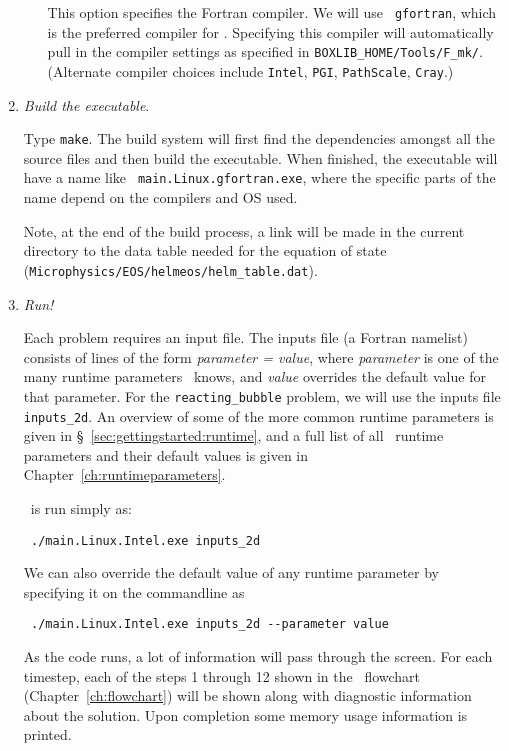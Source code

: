 \begin{enumerate}
\begin{itemize}
This option specifies the Fortran compiler.  We will use {\tt
gfortran}, which is the preferred compiler for \maestro.  Specifying
this compiler will automatically pull in the compiler settings as
specified in {\tt BOXLIB\_HOME/Tools/F\_mk/}.  (Alternate compiler
choices include {\tt Intel}, {\tt PGI}, {\tt PathScale}, {\tt Cray}.)

\end{itemize}


\item {\em Build the executable}.

Type {\tt make}.  The build system will first find the dependencies
amongst all the source files and then build the executable.  When
finished, the executable will have a name like {\tt
main.Linux.gfortran.exe}, where the specific parts of the name depend
on the compilers and OS used.

Note, at the end of the build process, a link will be made in the
current directory to the data table needed for the equation of state
({\tt Microphysics/EOS/helmeos/helm\_table.dat}).


\item {\em Run!}

Each problem requires an input file.  The inputs file (a Fortran
namelist) consists of
lines of the form {\em parameter = value}, where {\em parameter} is
one of the many runtime parameters \maestro\ knows, and {\em value}
overrides the default value for that parameter.  For the {\tt reacting\_bubble}
problem, we will use the inputs file {\tt inputs\_2d}.  An overview of
some of the more common runtime parameters is given
in \S~\ref{sec:gettingstarted:runtime}, and a full list of
all \maestro\ runtime parameters and their default values is given in
Chapter~\ref{ch:runtimeparameters}.

\maestro\ is run simply as:
\begin{verbatim}
 ./main.Linux.Intel.exe inputs_2d
\end{verbatim}
We can also override the default value of any runtime parameter by specifying
it on the commandline as
\begin{verbatim}
 ./main.Linux.Intel.exe inputs_2d --parameter value
\end{verbatim}

As the code runs, a lot of information will pass through the screen.
For each timestep, each of the steps 1 through 12 shown in
the \maestro\ flowchart (Chapter~\ref{ch:flowchart}) will be shown
along with diagnostic information about the solution.  Upon completion
some memory usage information is printed.



\end{enumerate}
